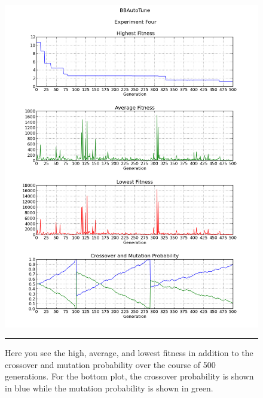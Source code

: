 \begin{figure}[htbp]
\centering
\includegraphics[width=5in]{../Figures/Chapter4/exp4_halcm.png}
\rule{35em}{0.5pt}
\caption[Experiment Four GA Metrics]{Here you see the high, average, and lowest fitness in addition to the crossover and mutation probability over the course of 500 generations. For the bottom plot, the crossover probability is shown in blue while the mutation probability is shown in green.}
\label{fig:exp4_halcm}
\end{figure}

